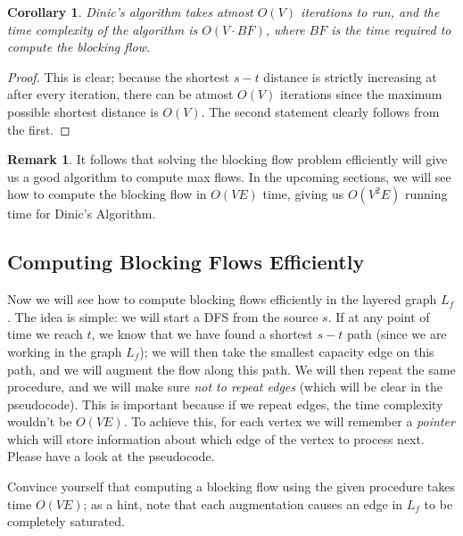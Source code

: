 \documentclass[12pt,a4paper]{amsart}
\numberwithin{equation}{section}
\newtheorem{Cor}{Corollary}[Th]
\theoremstyle{definition}
\newtheorem{Remark}{Remark}[Th]
\begin{document}
\begin{Cor}
	Dinic's algorithm takes atmost $O(V)$ iterations to run, and the time complexity of the algorithm is $O(V\cdot BF)$, where $BF$ is the time required to compute the blocking flow. 
\end{Cor}
\begin{proof}
	This is clear; because the shortest $s-t$ distance is strictly increasing at after every iteration, there can be atmost $O(V)$ iterations since the maximum possible shortest distance is $O(V)$. The second statement clearly follows from the first. 
\end{proof}
\begin{Remark}
	It follows that solving the blocking flow problem efficiently will give us a good algorithm to compute max flows. In the upcoming sections, we will see how to compute the blocking flow in $O(VE)$ time, giving us $O(V^2E)$ running time for Dinic's Algorithm. 
\end{Remark}

\subsection{Computing Blocking Flows Efficiently} Now we will see how to compute blocking flows efficiently in the layered graph $L_f$. The idea is simple: we will start a DFS from the source $s$. If at any point of time we reach $t$, we know that we have found a shortest $s-t$ path (since we are working in the graph $L_f$); we will then take the smallest capacity edge on this path, and we will augment the flow along this path. We will then repeat the same procedure, and we will make sure \textit{not to repeat edges} (which will be clear in the pseudocode). This is important because if we repeat edges, the time complexity wouldn't be $O(VE)$. To achieve this, for each vertex we will remember a \textit{pointer} which will store information about which edge of the vertex to process next. Please have a look at the pseudocode.

Convince yourself that computing a blocking flow using the given procedure takes time $O(VE)$; as a hint, note that each augmentation causes an edge in $L_f$ to be completely saturated. 
\end{document}
